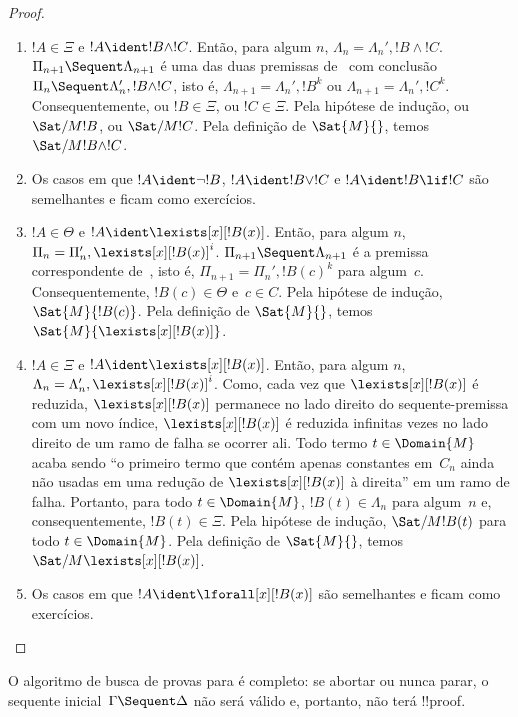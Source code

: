 \documentclass[../../../include/open-logic-section]{subfiles}
\begin{document}
\begin{proof}
\begin{enumerate}
  \item $!A \in \Xi$ e $!A \ident !B \land !C$. Então, para algum $n$,
  $\Lambda_n = \Lambda_n', !B \land !C$. $\Pi_{n+1} \Sequent
  \Lambda_{n+1}$ é uma das duas premissas de~\RightR{\land} com
  conclusão $\Pi_n \Sequent \Lambda'_n, !B \land !C$, isto é,
  $\Lambda_{n+1} = \Lambda_n', !B^k$ ou $\Lambda_{n+1} = \Lambda_n',
  !C^k$. Consequentemente, ou $!B \in \Xi$, ou $!C \in \Xi$. Pela
  hipótese de indução, ou $\Sat/{M}{!B}$, ou $\Sat/{M}{!C}$. Pela
  definição de $\Sat{M}{}$, temos $\Sat/{M}{!B \land !C}$.
  
  \item Os casos em que $!A \ident \lnot !B$, $!A \ident !B \lor !C$
  e $!A \ident !B \lif !C$ são semelhantes e ficam como exercícios.

  \item $!A \in \Theta$ e $!A \ident \lexists[x][!B(x)]$. Então, para
  algum $n$, $\Pi_n = \Pi_n', \lexists[x][!B(x)]^i$. $\Pi_{n+1}
  \Sequent \Lambda_{n+1}$ é a premissa correspondente
  de~\LeftR{\lexists}, isto é, $\Pi_{n+1} = \Pi_n', !B(c)^k$ para
  algum~$c$. Consequentemente, $!B(c) \in \Theta$ e~$c \in C$. Pela
  hipótese de indução, $\Sat{M}{!B(c)}$. Pela definição de
  $\Sat{M}{}$, temos $\Sat{M}{\lexists[x][!B(x)]}$.

  \item $!A \in \Xi$ e $!A \ident \lexists[x][!B(x)]$. Então, para algum
  $n$, $\Lambda_n = \Lambda_n', \lexists[x][!B(x)]^i$. Como, cada vez
  que $\lexists[x][!B(x)]$ é reduzida, $\lexists[x][!B(x)]$ permanece no
  lado direito do sequente-premissa com um novo índice,
  $\lexists[x][!B(x)]$ é reduzida infinitas vezes no lado direito de
  um ramo de falha se ocorrer ali. Todo termo $t \in \Domain{M}$ acaba
  sendo ``o primeiro termo que contém apenas constantes em~$C_n$ ainda
  não usadas em uma redução de $\lexists[x][!B(x)]$ à direita'' em um
  ramo de falha. Portanto, para todo $t \in \Domain{M}$, $!B(t) \in
  \Lambda_n$ para algum~$n$ e, consequentemente, $!B(t) \in \Xi$.
  Pela hipótese de indução, $\Sat/{M}{!B(t)}$ para todo $t \in
  \Domain{M}$. Pela definição de $\Sat{M}{}$, temos
  $\Sat/{M}{\lexists[x][!B(x)]}$.

  \item Os casos em que $!A \ident \lforall[x][!B(x)]$ são semelhantes e
  ficam como exercícios.
\end{enumerate}
\end{proof}

\begin{cor} O algoritmo de busca de provas para
 é completo: se abortar ou nunca parar, o sequente
inicial~$\Gamma \Sequent \Delta$ não será válido e, portanto, não terá
!!{proof}.
\end{cor}
\end{document}
